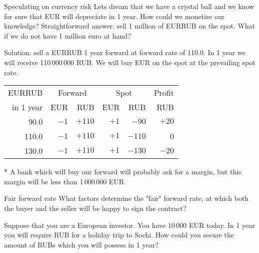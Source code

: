 \documentclass{beamer}
\begin{document}
\begin{frame}{Speculating on currency risk}
\justify
Lets dream that we have a crystal ball and we know for sure that EUR will depreciate in 1 year. How could we monetize our knowledge? Straightforward answer: sell 1 million of EURRUB on the spot. What if we do not have 1 million euro at hand?

\justify
Solution: sell a EURRUB 1 year forward at forward rate of 110.0. In 1 year  we will receive 110\,000\,000 RUB. We will buy EUR on the spot at the prevailing spot rate.

\justify
\centering
\begin{tabular}{r|r|r|r|r|r}
EURRUB      & \multicolumn{2}{c|}{Forward} & \multicolumn{2}{c|}{Spot} & Profit \\
\cline{2-5}
in 1 year & EUR     & RUB     & EUR     & RUB      & RUB \\ \hline
90.0      & $-1$ & $+110$  & $+1$ & $-90$ & $+20$ \\
110.0      & $-1$ & $+110$  & $+1$ & $-110$ & 0 \\
130.0     & $-1$& $+110$  & $+1$ & $-130$ & $-20$ \\
\end{tabular}
 
\justify
* A bank which will buy our forward will probably ask for a margin, but this margin will be less than 1\,000\,000 EUR.
\end{frame}



\begin{frame}{Fair forward rate}
\justify
What factors determine the "fair" forward rate, at which both the buyer and the seller will be happy to sign the contract? 

\justify
Suppose that you are a European investor. You have 10\,000 EUR today. In 1 year you will require RUB for a holiday trip to Sochi. How could you secure the amount of RUBs which you will possess in 1 year?
\end{frame}
\end{document}
